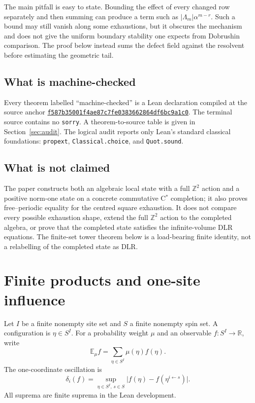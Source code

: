 \documentclass[11pt]{article}
\theoremstyle{definition}
\newcommand{\R}{\mathbb R}
\newcommand{\Z}{\mathbb Z}
\newcommand{\E}{\mathbb E}
\newcommand{\abs}[1]{\lvert #1\rvert}
\newcommand{\sourceanchor}{f587b35001f4ae87c7fe0383662864df6bc9a1c0}
\begin{document}
The main pitfall is easy to state.  Bounding the effect of every changed row
separately and then summing can produce a term such as
$\abs{\Lambda_m}\alpha^{m-r}$.  Such a bound may still vanish along some
exhaustions, but it obscures the mechanism and does not give the uniform
boundary stability one expects from Dobrushin comparison.  The proof below
instead sums the defect field against the resolvent before estimating the
geometric tail.

\subsection*{What is machine-checked}

Every theorem labelled ``machine-checked'' is a Lean declaration compiled at
the source anchor
\href{https://github.com/lluiseriksson/THE-ERIKSSON-PROGRAMME/commit/\sourceanchor}{\nolinkurl{\sourceanchor}}.
The terminal source contains no \texttt{sorry}.  A theorem-to-source table is
given in Section~\ref{sec:audit}.  The logical audit reports only Lean's
standard classical foundations: \texttt{propext}, \texttt{Classical.choice},
and \texttt{Quot.sound}.

\subsection*{What is not claimed}

The paper constructs both an algebraic local state with a full $\Z^2$ action
and a positive norm-one state on a concrete commutative C$^*$ completion; it
also proves free--periodic equality for the centred square exhaustion.  It
does not compare every possible exhaustion shape, extend the full $\Z^2$
action to the completed algebra, or prove that the completed state satisfies
the infinite-volume DLR equations.  The finite-set tower theorem below is a
load-bearing finite identity, not a relabelling of the completed state as DLR.

\section{Finite products and one-site influence}

Let $I$ be a finite nonempty site set and $S$ a finite nonempty spin set.  A
configuration is $\eta\in S^I$.  For a probability weight $\mu$ and an
observable $f:S^I\to\R$, write
\[
  \E_\mu f=\sum_{\eta\in S^I}\mu(\eta)f(\eta).
\]
The one-coordinate oscillation is
\[
  \delta_i(f)=
  \sup_{\eta\in S^I,\,s\in S}
  \abs{f(\eta)-f(\eta^{i\leftarrow s})}.
\]
All suprema are finite suprema in the Lean development.
\end{document}
